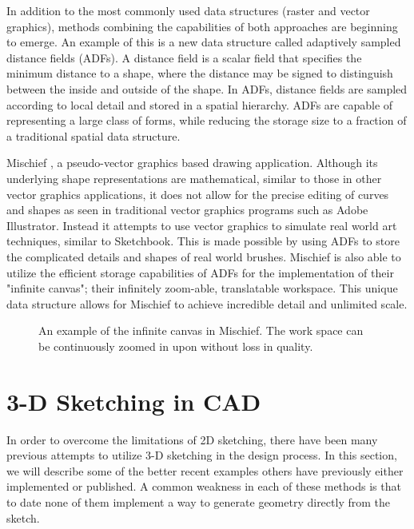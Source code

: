 In addition to the most commonly used data structures (raster and vector graphics), methods combining the capabilities of both approaches are beginning to emerge.
An example of this is a new data structure called adaptively sampled distance fields \autocite{asdf} (ADFs).
A distance field is a scalar field that specifies the minimum distance to a shape, where the distance may be signed to distinguish between the inside and outside of the shape.
In ADFs, distance fields are sampled according to local detail and stored in a spatial hierarchy.
ADFs are capable of representing a large class of forms, while reducing the storage size to a fraction of a traditional spatial data structure.

Mischief \autocite{mischief}, a pseudo-vector graphics based drawing application. 
Although its underlying shape representations are mathematical, similar to those in other vector graphics applications, it does not allow for the precise editing of curves and shapes as seen in traditional vector graphics programs such as Adobe Illustrator. 
Instead it attempts to use vector graphics to simulate real world art techniques, similar to Sketchbook.
This is made possible by using ADFs to store the complicated details and shapes of real world brushes.
Mischief is also able to utilize the efficient storage capabilities of ADFs for the implementation of their "infinite canvas"; their infinitely zoom-able, translatable workspace. 
This unique data structure allows for Mischief to achieve incredible detail and unlimited scale.

\begin{figure}
\centering
{}
\caption[An example of the infinite canvas in Mischief]
{An example of the infinite canvas in Mischief. The work space can be continuously zoomed in upon without loss in quality.}
\end{figure}

\section{3-D Sketching in CAD}

In order to overcome the limitations of 2D sketching, there have been many previous attempts to utilize 3-D sketching in the design process. 
In this section, we will describe some of the better recent examples others have previously either implemented or published.
A common weakness in each of these methods is that to date none of them implement a way to generate geometry directly from the sketch.

